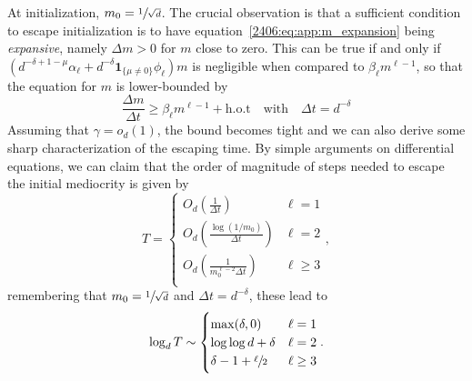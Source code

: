 At initialization, \(m_0 = \sfrac{1}{\sqrt{d}}\). The crucial observation is that a sufficient condition to escape initialization is to have equation~\eqref{2406:eq:app:m_expansion} being  \emph{expansive}, namely \(\Delta m>0\) for \(m\) close to zero. This can be true if and only if \(\left(d^{-\delta+1-\mu}\alpha_\ell + d^{-\delta}\mathbf{1}_{\{\mu\neq0\}}\phi_\ell   \right)m\) is negligible when compared to \(\beta_\ell m^{\ell-1}\), so that the equation for \(m\) is lower-bounded by
\begin{equation} \label{2406:eq:app:m_expansive}
     \frac{\Delta m}{\Delta t} \ge \beta_\ell m^{\ell-1} + \text{h.o.t} \quad\text{with}\quad \Delta t = d^{-\delta}
\end{equation}
Assuming that \(\gamma = o_d(1)\), the bound becomes tight and we can also derive some sharp characterization of the escaping time. By simple arguments on differential equations, we can claim that the order of magnitude of steps needed to escape the initial mediocrity is given by
\[
 T = \begin{cases}
     O_d\left(\frac{1}{\Delta t}\right) & \ell=1 \\
     O_d\left(\frac{\log(1/m_0)}{\Delta t}\right) & \ell=2 \\
     O_d\left(\frac{1} {m_0^{\ell-2}\Delta t}\right) & \ell\ge3 \\
 \end{cases},
\]
remembering that \(m_0=\sfrac{1}{\sqrt{d}}\) and \(\Delta t = d^{-\delta}\), these lead to
\begin{equation} \label{2406:eq:app:escapingtimes}
\log_d T \sim \begin{cases}
    {\rm max}(\delta,0) & \ell=1 \\
    \log\log d + \delta & \ell=2 \\
    \delta - 1 +\sfrac{\ell}{2} & \ell\ge3 \\
 \end{cases}.
\end{equation}

